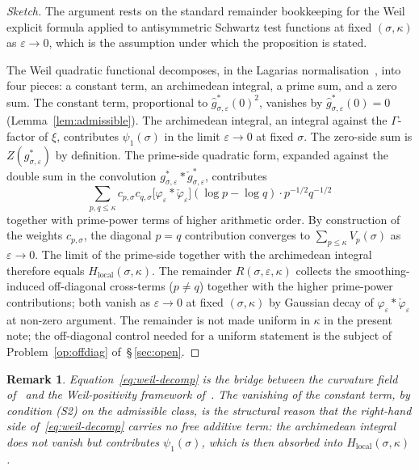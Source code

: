 \documentclass[11pt]{article}
\newtheorem*{remark}{Remark}
\newcommand{\Hlocal}{H_{\mathrm{local}}}
\begin{document}
\begin{proof}[Sketch]
The argument rests on the standard remainder bookkeeping for
the Weil explicit formula applied to antisymmetric Schwartz test
functions at fixed $(\sigma,\kappa)$ as $\varepsilon\to 0$, which
is the assumption under which the proposition is stated.

The Weil quadratic functional decomposes, in the Lagarias
normalisation~\cite{Lagarias}, into four pieces: a constant
term, an archimedean integral, a prime sum, and a zero sum.
The constant term, proportional to
$\widehat g^*_{\sigma,\varepsilon}(0)^2$, vanishes by
$\widehat g^*_{\sigma,\varepsilon}(0)=0$
(Lemma~\ref{lem:admissible}).
The archimedean integral, an integral against the
$\Gamma$-factor of $\xi$, contributes $\psi_1(\sigma)$ in the
limit $\varepsilon\to 0$ at fixed $\sigma$.
The zero-side sum is $Z(g^*_{\sigma,\varepsilon})$ by definition.
The prime-side quadratic form, expanded against the
double sum in the convolution
$g^*_{\sigma,\varepsilon}*\check g^*_{\sigma,\varepsilon}$,
contributes
\[
\sum_{p,q\le\kappa} c_{p,\sigma} c_{q,\sigma}
\bigl[\varphi_\varepsilon*\check\varphi_\varepsilon\bigr](\log p-\log q)
\cdot p^{-1/2} q^{-1/2}
\]
together with prime-power terms of higher arithmetic order.
By construction of the weights $c_{p,\sigma}$, the diagonal
$p=q$ contribution converges to
$\sum_{p\le\kappa}V_p(\sigma)$ as $\varepsilon\to 0$.
The limit of the prime-side together with the archimedean
integral therefore equals $\Hlocal(\sigma,\kappa)$.
The remainder $R(\sigma,\varepsilon,\kappa)$
collects the smoothing-induced off-diagonal cross-terms
($p\ne q$) together with the higher prime-power contributions;
both vanish as $\varepsilon\to 0$ at fixed $(\sigma,\kappa)$ by
Gaussian decay of $\varphi_\varepsilon*\check\varphi_\varepsilon$
at non-zero argument.
The remainder is not made uniform in $\kappa$ in the present
note; the off-diagonal control needed for a uniform statement
is the subject of Problem~\ref{op:offdiag} of~\S\,\ref{sec:open}.
\end{proof}

\begin{remark}
Equation~\eqref{eq:weil-decomp} is the bridge between the
curvature field of~\cite{Paper1} and the Weil-positivity
framework of~\cite{Lagarias}.
The vanishing of the constant term, by condition (S2) on the
admissible class, is the structural reason that the right-hand
side of~\eqref{eq:weil-decomp} carries no free additive term:
the archimedean integral does not vanish but contributes
$\psi_1(\sigma)$, which is then absorbed into
$\Hlocal(\sigma,\kappa)$.
\end{remark}
\end{document}
